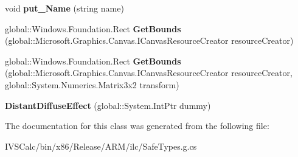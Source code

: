 \begin{DoxyCompactItemize}
void {\bfseries put\+\_\+\+Name} (string name)
\item 
\mbox{\label{class_microsoft_1_1_graphics_1_1_canvas_1_1_effects_1_1_distant_diffuse_effect_a1cb8c03778e97d9bc464859b2d31a0f9}} 
global\+::\+Windows.\+Foundation.\+Rect {\bfseries Get\+Bounds} (global\+::\+Microsoft.\+Graphics.\+Canvas.\+I\+Canvas\+Resource\+Creator resource\+Creator)
\item 
\mbox{\label{class_microsoft_1_1_graphics_1_1_canvas_1_1_effects_1_1_distant_diffuse_effect_a285663b04cb7fc7b35148015b81d8e72}} 
global\+::\+Windows.\+Foundation.\+Rect {\bfseries Get\+Bounds} (global\+::\+Microsoft.\+Graphics.\+Canvas.\+I\+Canvas\+Resource\+Creator resource\+Creator, global\+::\+System.\+Numerics.\+Matrix3x2 transform)
\item 
\mbox{\label{class_microsoft_1_1_graphics_1_1_canvas_1_1_effects_1_1_distant_diffuse_effect_a22bc8ecf39b5603009d3e448ec80f51e}} 
{\bfseries Distant\+Diffuse\+Effect} (global\+::\+System.\+Int\+Ptr dummy)
\end{DoxyCompactItemize}


The documentation for this class was generated from the following file\+:\begin{DoxyCompactItemize}
\item 
I\+V\+S\+Calc/bin/x86/\+Release/\+A\+R\+M/ilc/Safe\+Types.\+g.\+cs\end{DoxyCompactItemize}
